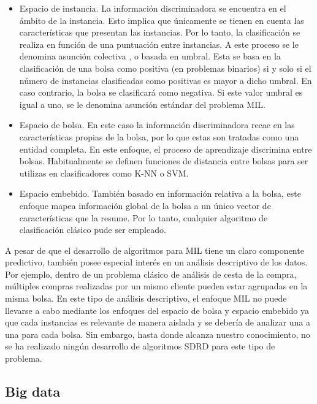 \documentclass[c5paper,10pt,twoside]{book}	   	%
\begin{document}
\begin{itemize}
	\item Espacio de instancia. La información discriminadora se encuentra en el ámbito de la instancia. Esto implica que únicamente se tienen en cuenta las características que presentan las instancias. Por lo tanto, la clasificación se realiza en función de una puntuación entre instancias. A este proceso se le denomina asunción colectiva \cite{Weidmann2003}, o basada en umbral. Esta se basa en la clasificación de una bolsa como positiva (en problemas binarios) si y solo si el número de instancias clasificadas como positivas es mayor a dicho umbral. En caso contrario, la bolsa se clasificará como negativa. Si este valor umbral es igual a uno, se le denomina asunción estándar del problema \ac{MIL}.
	
	\item Espacio de bolsa. En este caso la información discriminadora recae en las características propias de la bolsa, por lo que estas son tratadas como una entidad completa. En este enfoque, el proceso de aprendizaje discrimina entre bolsas. Habitualmente se definen funciones de distancia entre bolsas para ser utilizas en clasificadores como K-NN o SVM.
	
	\item Espacio embebido. También basado en información relativa a la bolsa, este enfoque mapea información global de la bolsa a un único vector de características que la resume. Por lo tanto, cualquier algoritmo de clasificación clásico pude ser empleado.
\end{itemize}

A pesar de que el desarrollo de algoritmos para \ac{MIL} tiene un claro componente predictivo, también posee especial interés en un análisis descriptivo de los datos. Por ejemplo, dentro de un problema clásico de análisis de cesta de la compra, múltiples compras realizadas por un mismo cliente pueden estar agrupadas en la misma bolsa. En este tipo de análisis descriptivo, el enfoque \ac{MIL} no puede llevarse a cabo mediante los enfoques del espacio de bolsa y espacio embebido ya que cada instancias es relevante de manera aislada y se debería de analizar una a una para cada bolsa. Sin embargo, hasta donde alcanza nuestro conocimiento, no se ha realizado ningún desarrollo de algoritmos \ac{SDRD} para este tipo de problema.

\subsection{Big data} \label{sec:bigdata}
\end{document}
